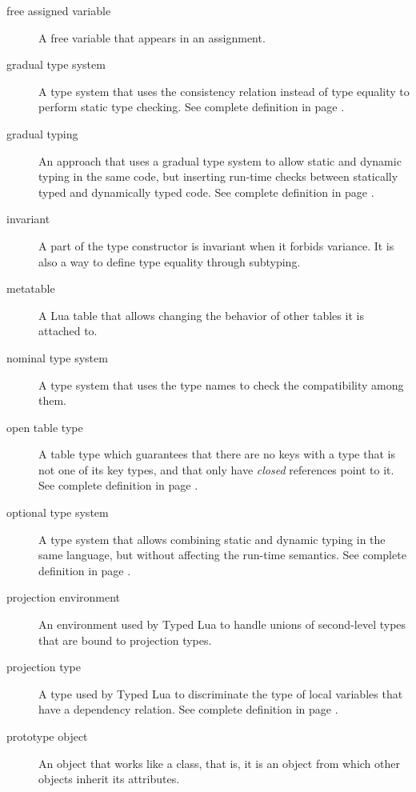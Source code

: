 \begin{description}
\item[free assigned variable] A free variable that appears in an assignment.

\item[gradual type system] A type system that uses the consistency relation
instead of type equality to perform static type checking.
See complete definition in page \pageref{sec:gradual}.

\item[gradual typing] An approach that uses a gradual type system to allow
static and dynamic typing in the same code, but inserting run-time checks
between statically typed and dynamically typed code.
See complete definition in page \pageref{sec:gradual}.

\item[invariant] A part of the type constructor is invariant when it forbids variance.
It is also a way to define type equality through subtyping.

\item[metatable] A Lua table that allows changing the behavior of other tables
it is attached to.

\item[nominal type system] A type system that uses the type names to check the
compatibility among them.

\item[open table type] A table type which guarantees that there are no
keys with a type that is not one of its key types, and that only have
\emph{closed} references point to it.
See complete definition in page \pageref{def:tabletype}.

\item[optional type system] A type system that allows combining static and
dynamic typing in the same language, but without affecting the run-time semantics.
See complete definition in page \pageref{sec:optional}.

\item[projection environment] An environment used by Typed Lua to handle unions of
second-level types that are bound to projection types.

\item[projection type] A type used by Typed Lua to discriminate the type of local
variables that have a dependency relation.
See complete definition in page \pageref{def:projectiontype}.

\item[prototype object] An object that works like a class, that is, it is an object from
which other objects inherit its attributes.


\end{description}
